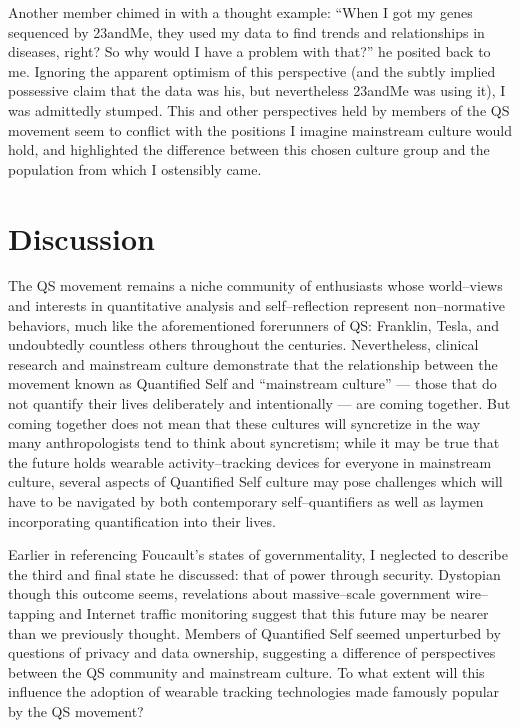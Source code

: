 \documentclass{article}
\begin{document}
Another member chimed in with a thought example:
``When I got my genes sequenced by 23andMe,
they used my data to find trends and relationships in diseases,
right? So why would I have a problem with that?'' he posited back to me.
Ignoring the apparent optimism of this perspective (and the subtly implied possessive claim that the data was his,
but nevertheless 23andMe was using it),
I was admittedly stumped.
This and other perspectives held by members of the QS movement seem to conflict with the positions I imagine mainstream culture would hold,
and highlighted the difference between this chosen culture group and the population from which I ostensibly came.

\section*{Discussion}
The QS movement remains a niche community of enthusiasts whose world--views and interests in quantitative analysis and self--reflection represent non--normative behaviors,
much like the aforementioned forerunners of QS:
Franklin,
Tesla,
and undoubtedly countless others throughout the centuries.
Nevertheless,
clinical research and mainstream culture demonstrate that the relationship between the movement known as Quantified Self and ``mainstream culture''
--- those that do not quantify their lives deliberately and intentionally ---
are coming together.
But coming together does not mean that these cultures will syncretize in the way many anthropologists tend to think about syncretism;
while it may be true that the future holds wearable activity--tracking devices for everyone in mainstream culture,
several aspects of Quantified Self culture may pose challenges which will have to be navigated by both contemporary self--quantifiers as well as laymen incorporating quantification into their lives.

Earlier in referencing Foucault's states of governmentality,
I neglected to describe the third and final state he discussed:
that of power through security.
Dystopian though this outcome seems,
revelations about massive--scale government wire--tapping and Internet traffic monitoring suggest that this future may be nearer than we previously thought.
Members of Quantified Self seemed unperturbed by questions of privacy and data ownership,
suggesting a difference of perspectives between the QS community and mainstream culture.
To what extent will this influence the adoption of wearable tracking technologies made famously popular by the QS movement? 
\end{document}
